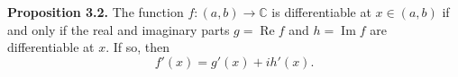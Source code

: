 \textbf{Proposition 3.2.} The function $f: (a, b) \to \mathbb{C}$ is differentiable at $x \in (a, b)$ if and only if the real and imaginary parts $g = \operatorname{Re} f$ and $h = \operatorname{Im} f$ are differentiable at $x$. If so, then
$$f'(x) = g'(x) + i h'(x).$$
